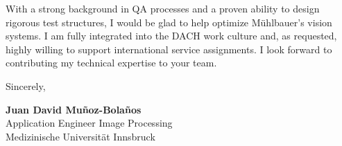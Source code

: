 \documentclass[11pt,a4paper]{article}
\begin{document}
With a strong background in QA processes and a proven ability to design rigorous test structures, I would be glad to help optimize Mühlbauer’s vision systems. I am fully integrated into the DACH work culture and, as requested, highly willing to support international service assignments. I look forward to contributing my technical expertise to your team. 



\vspace{12pt}

Sincerely,

\vspace{8pt}

\textbf{Juan David Muñoz-Bolaños} \\
Application Engineer Image Processing \\
Medizinische Universität Innsbruck
\end{document}
